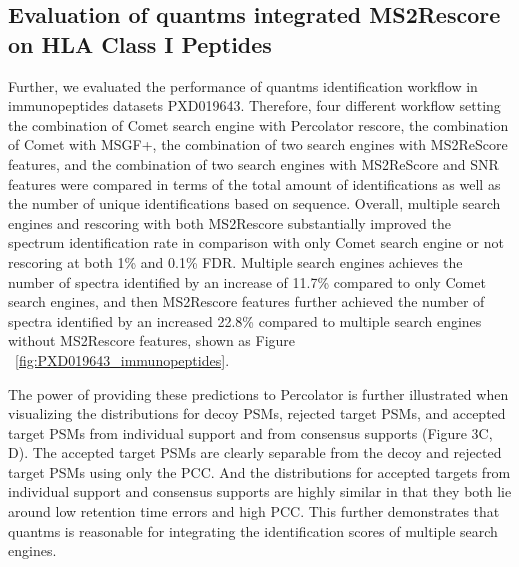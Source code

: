 \documentclass[12pt]{article}
\begin{document}
\subsection{Evaluation of quantms integrated MS2Rescore on HLA Class I Peptides}
Further, we evaluated the performance of quantms identification workflow in immunopeptides datasets PXD019643. Therefore, four different workflow setting the combination of Comet search engine with Percolator rescore, the combination of Comet with MSGF+, the combination of two search engines with MS2ReScore features, and the combination of two search engines with MS2ReScore and SNR features were compared in terms of the total amount of identifications as well as the number of unique identifications based on sequence. Overall, multiple search engines and rescoring with both MS2Rescore substantially improved the spectrum identification rate in comparison with only Comet search engine or not rescoring at both 1\% and 0.1\% FDR. Multiple search engines achieves the number of spectra identified by an increase of  11.7\% compared to only Comet search engines, and then MS2Rescore features further achieved the number of spectra identified by an increased 22.8\% compared to multiple search engines without MS2Rescore features, shown as Figure ~\ref{fig:PXD019643_immunopeptides}.

The power of providing these predictions to Percolator is further illustrated when visualizing the distributions for decoy PSMs, rejected target PSMs, and accepted target PSMs from individual support and from consensus supports (Figure 3C, D). The accepted target PSMs are clearly separable from the decoy and rejected target PSMs using only the PCC. And the distributions for accepted targets from individual support and consensus supports are highly similar in that they both lie around low retention time errors and high PCC. This further demonstrates that quantms is reasonable for integrating the identification scores of multiple search engines. 
\end{document}
